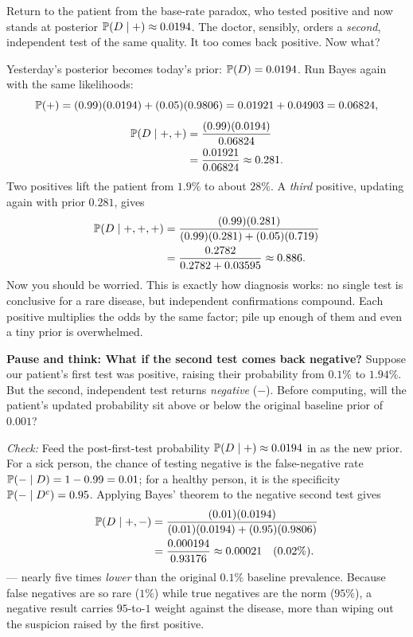 \begin{example}
\label{ch05:ex-second-test}
Return to the patient from the base-rate paradox, who tested positive and now stands at
posterior $\P(D \given +) \approx 0.0194$. The doctor, sensibly, orders a \emph{second},
independent test of the same quality. It too comes back positive. Now what?

Yesterday's posterior becomes today's prior: $\P(D) = 0.0194$. Run Bayes again with the
same likelihoods:
\[
  \P(+) = (0.99)(0.0194) + (0.05)(0.9806) = 0.01921 + 0.04903 = 0.06824,
\]
\begin{align*}
  \P(D \given +,+) &= \frac{(0.99)(0.0194)}{0.06824} \\
                     &= \frac{0.01921}{0.06824} \approx 0.281.
\end{align*}
Two positives lift the patient from $1.9\%$ to about $28\%$. A \emph{third} positive,
updating again with prior $0.281$, gives
\begin{align*}
  \P(D\given +,+,+) &= \frac{(0.99)(0.281)}{(0.99)(0.281)+(0.05)(0.719)} \\
                     &= \frac{0.2782}{0.2782+0.03595} \approx 0.886.
\end{align*}
Now you should be worried. This is exactly how diagnosis works: no single test
is conclusive for a rare disease, but independent confirmations compound. Each positive
multiplies the odds by the same factor; pile up enough of them and even a tiny prior is
overwhelmed.
\end{example}

\begin{recoverybox}
\textbf{Pause and think: What if the second test comes back negative?}
Suppose our patient's first test was positive, raising their probability from $0.1\%$ to
$1.94\%$. But the second, independent test returns \emph{negative} ($-$). Before
computing, will the patient's updated probability sit above or below the original baseline
prior of $0.001$?

\emph{Check:} Feed the post-first-test probability $\P(D \given +) \approx 0.0194$ in as
the new prior. For a sick person, the chance of testing negative is the false-negative
rate $\P(- \given D) = 1 - 0.99 = 0.01$; for a healthy person, it is the specificity
$\P(- \given D^c) = 0.95$. Applying Bayes' theorem to the negative second test gives
\begin{align*}
  \P(D \given +, -)
  &= \frac{(0.01)(0.0194)}{(0.01)(0.0194) + (0.95)(0.9806)} \\
  &= \frac{0.000194}{0.93176} \approx 0.00021 \quad (0.02\%).
\end{align*}
--- nearly five times \emph{lower} than the original $0.1\%$ baseline prevalence. Because
false negatives are so rare ($1\%$) while true negatives are the norm ($95\%$), a negative
result carries $95$-to-$1$ weight against the disease, more than wiping out the suspicion
raised by the first positive.
\end{recoverybox}

